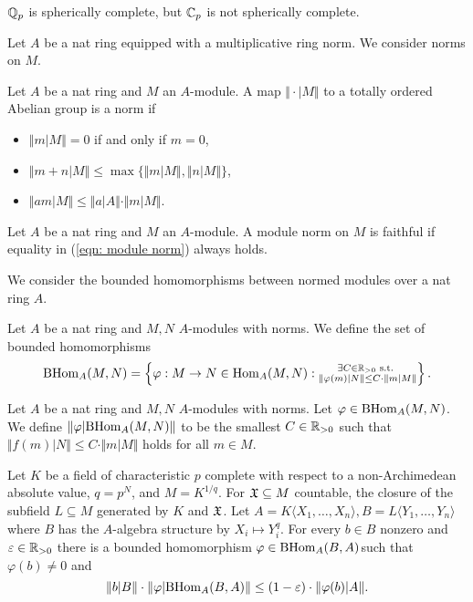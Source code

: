 \begin{example}
    $\mathbb{Q}_{p}$ is spherically complete, but $\mathbb{C}_{p}$ is not spherically complete. 
\end{example}
Let $A$ be a nat ring  equipped with a multiplicative ring norm. We consider norms on $M$. 
\begin{definition}\label{def: module norm}
    Let $A$ be a nat ring and $M$ an $A$-module. A map $\Vert\cdot|M\Vert$ to a totally ordered Abelian group is a norm if
\begin{itemize}
\item $\Vert m|M\Vert = 0$ if and only if $m=0$,
\item $\Vert m+n|M\Vert \le \max\{\Vert m|M\Vert, \Vert n|M\Vert\}$,
\item $\Vert am|M\Vert\leq\Vert a|A\Vert\cdot\Vert m|M\Vert$.
\end{itemize}
\end{definition}
\begin{definition}\label{def: faithful module norm}
    Let $A$ be a nat ring and $M$ an $A$-module. A module norm on $M$ is faithful if equality in (\ref{eqn: module norm}) always holds. 
\end{definition}
We consider the bounded homomorphisms between normed modules over a nat ring $A$. 
\begin{definition}\label{def: bounded module homomorphisms}
    Let $A$ be a nat ring and $M,N$ $A$-modules with norms. We define the set of bounded homomorphisms 
    \begin{equation}\label{eqn: def of BHom}
        \mathrm{BHom}_{A}(M,N)=\left\{\varphi:M\to N\in\mathrm{Hom}_{A}(M,N):\substack{\exists C\in\mathbb{R}_{>0}\text{ s.t. }\\ \Vert \varphi(m)|N\Vert\leq C\cdot\Vert m|M\Vert}\right\}.
    \end{equation}
\end{definition}
\begin{definition}\label{def: norm of Homomorphism}
    Let $A$ be a nat ring and $M,N$ $A$-modules with norms. Let $\varphi\in\mathrm{BHom}_{A}(M,N)$. We define $\Vert\varphi|\mathrm{BHom}_{A}(M,N)\Vert$ to be the smallest $C\in\mathbb{R}_{>0}$ such that $\Vert f(m)|N\Vert\leq C\cdot\Vert m|M\Vert$ holds for all $m\in M$. 
\end{definition}
\begin{lemma}\label{lem: p-power roots}
    Let $K$ be a field of characteristic $p$ complete with respect to a non-Archimedean absolute value, $q=p^{N}$, and $M=K^{1/q}$. For $\mathfrak{X}\subseteq M$ countable, the closure of the subfield $L\subseteq M$ generated by $K$ and $\mathfrak{X}$. Let $A=K\langle X_{1},\dots,X_{n}\rangle, B=L\langle Y_{1},\dots,Y_{n}\rangle$ where $B$ has the $A$-algebra structure by $X_{i}\mapsto Y_{i}^{q}$. For every $b\in B$ nonzero and $\varepsilon\in\mathbb{R}_{>0}$ there is a bounded homomorphism $\varphi\in\mathrm{BHom}_{A}(B,A)$such that $\varphi(b)\neq0$ and 
    $$\Vert b|B\Vert\cdot\Vert\varphi|\mathrm{BHom}_{A}(B,A)\Vert\leq(1-\varepsilon)\cdot\Vert\varphi(b)|A\Vert.$$
\end{lemma}
